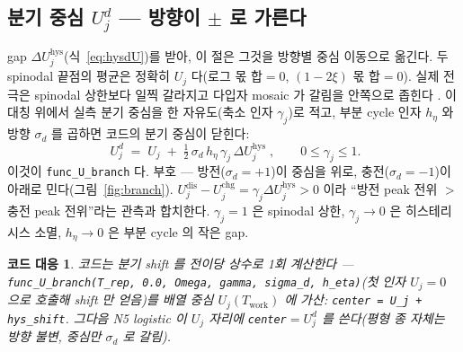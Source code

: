 \documentclass[11pt,a4paper]{article}
\newtheorem*{codebox}{코드 대응}
\newcommand{\work}{\mathrm{work}}
\newcommand{\dis}{\mathrm{dis}}
\newcommand{\chg}{\mathrm{chg}}
\newcommand{\hys}{\mathrm{hys}}
\newcommand{\code}[1]{\texttt{#1}}
\begin{document}
\subsection{분기 중심 $U_j^d$ — 방향이 $\pm$ 로 가른다}
gap $\Delta U_j^\hys$(식~\eqref{eq:hysdU})를 받아, 이 절은 그것을 방향별 중심 이동으로 옮긴다. 두 spinodal 끝점의 평균은 정확히 $U_j$ 다(로그 몫 합$=0$, $(1-2\xi)$ 몫 합$=0$). 실제 전극은 spinodal 상한보다 일찍 갈라지고 다입자 mosaic 가 갈림을 안쪽으로 좁힌다 \cite{dreyer2010}. 이 대칭 위에서 실측 분기 중심을 한 자유도(축소 인자 $\gamma_j$)로 적고, 부분 cycle 인자 $h_\eta$ 와 방향 $\sigma_d$ 를 곱하면 코드의 분기 중심이 닫힌다:
\begin{equation}
\boxed{\;U_j^{d}\;=\;U_j\;+\;\tfrac12\,\sigma_d\,h_\eta\,\gamma_j\,\Delta U_j^\hys\;,\qquad 0\le\gamma_j\le1.}
\label{eq:hyscenter}
\end{equation}
이것이 \code{func\_U\_branch} 다. 부호 — 방전($\sigma_d=+1$)이 중심을 위로, 충전($\sigma_d=-1$)이 아래로 민다(그림~\ref{fig:branch}). $U_j^\dis-U_j^\chg=\gamma_j\Delta U_j^\hys>0$ 이라 ``방전 peak 전위 $>$ 충전 peak 전위''라는 관측과 합치한다. $\gamma_j=1$ 은 spinodal 상한, $\gamma_j\to0$ 은 히스테리시스 소멸, $h_\eta\to0$ 은 부분 cycle 의 작은 gap.

\begin{codebox}
코드는 분기 shift 를 \emph{전이당 상수}로 1회 계산한다 — \code{func\_U\_branch(T\_rep, 0.0, Omega, gamma, sigma\_d, h\_eta)}(첫 인자 $U_j=0$ 으로 호출해 shift 만 얻음)를 배열 중심 $U_j(T_\work)$ 에 가산: \code{center = U\_j + hys\_shift}. 그다음 N5 logistic 이 $U_j$ 자리에 \code{center}$=U_j^d$ 를 쓴다(평형 종 자체는 방향 불변, 중심만 $\sigma_d$ 로 갈림).
\end{codebox}
\end{document}
